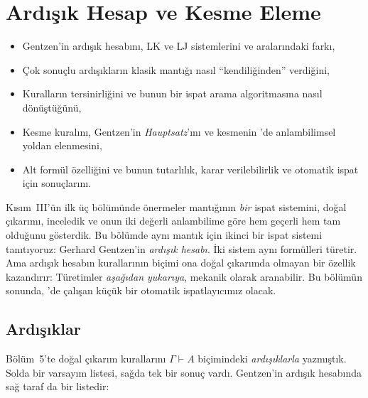\chapter{Ardışık Hesap ve Kesme Eleme}\label{bol:ardisik}

\begin{bolumhedefleri}
\begin{itemize}
  \item Gentzen'in ardışık hesabını, LK ve LJ sistemlerini ve aralarındaki
        farkı,
  \item Çok sonuçlu ardışıkların klasik mantığı nasıl ``kendiliğinden''
        verdiğini,
  \item Kuralların tersinirliğini ve bunun bir ispat arama algoritmasına
        nasıl dönüştüğünü,
  \item Kesme kuralını, Gentzen'in \emph{Hauptsatz}'ını ve kesmenin
        \Lean{}'de anlambilimsel yoldan elenmesini,
  \item Alt formül özelliğini ve bunun tutarlılık, karar verilebilirlik ve
        otomatik ispat için sonuçlarını.
\end{itemize}
\end{bolumhedefleri}

Kısım~III'ün ilk üç bölümünde önermeler mantığının \emph{bir} ispat
sistemini, doğal çıkarımı, inceledik ve onun iki değerli anlambilime göre
hem geçerli hem tam olduğunu gösterdik. Bu bölümde aynı mantık için
ikinci bir ispat sistemi tanıtıyoruz: Gerhard Gentzen'in \emph{ardışık
hesabı}. İki sistem aynı formülleri türetir. Ama ardışık hesabın
kurallarının biçimi ona doğal çıkarımda olmayan bir özellik kazandırır:
Türetimler \emph{aşağıdan yukarıya}, mekanik olarak aranabilir. Bu bölümün
sonunda, \Lean{}'de çalışan küçük bir otomatik ispatlayıcımız olacak.

\section{Ardışıklar}\label{sec:ardisiklar}

Bölüm~5'te doğal çıkarım kurallarını $\Gamma \vdash A$ biçimindeki
\emph{ardışıklarla} yazmıştık. Solda bir varsayım listesi, sağda tek bir
sonuç vardı. Gentzen'in ardışık hesabında sağ taraf da bir listedir:

